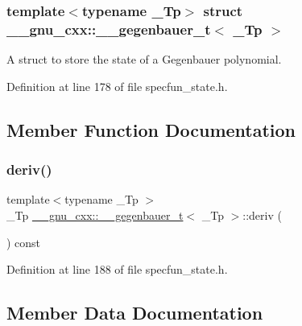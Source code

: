 \subsubsection*{template$<$typename \+\_\+\+Tp$>$\newline
struct \+\_\+\+\_\+gnu\+\_\+cxx\+::\+\_\+\+\_\+gegenbauer\+\_\+t$<$ \+\_\+\+Tp $>$}

A struct to store the state of a Gegenbauer polynomial. 

Definition at line 178 of file specfun\+\_\+state.\+h.



\subsection{Member Function Documentation}
\mbox{\label{struct____gnu__cxx_1_1____gegenbauer__t_a7f67b4bddba90569373b9a7b67492f08}} 
\subsubsection{\texorpdfstring{deriv()}{deriv()}}
{\footnotesize\ttfamily template$<$typename \+\_\+\+Tp $>$ \\
\+\_\+\+Tp \hyperlink{struct____gnu__cxx_1_1____gegenbauer__t}{\+\_\+\+\_\+gnu\+\_\+cxx\+::\+\_\+\+\_\+gegenbauer\+\_\+t}$<$ \+\_\+\+Tp $>$\+::deriv (\begin{DoxyParamCaption}{ }\end{DoxyParamCaption}) const\hspace{0.3cm}{\ttfamily [inline]}}



Definition at line 188 of file specfun\+\_\+state.\+h.



\subsection{Member Data Documentation}
\mbox{\label{struct____gnu__cxx_1_1____gegenbauer__t_a84d400a2aa985534a294c1b4c4dedd40}} 
